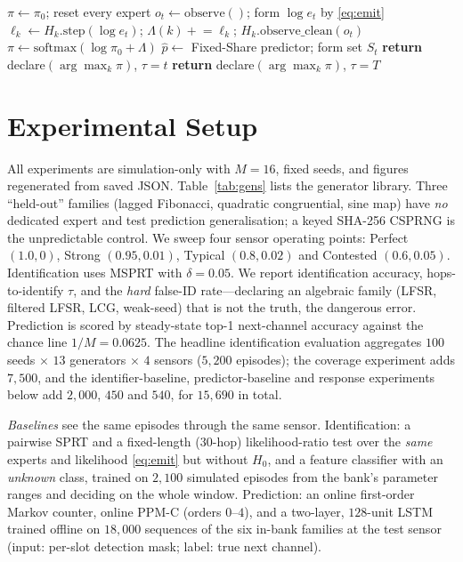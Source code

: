 \documentclass[conference]{IEEEtran}
\begin{document}
\begin{algorithm}[t]
\caption{Engagement loop (one emitter, window $T$)}
\label{alg:loop}
\begin{algorithmic}
\STATE $\pi\leftarrow\pi_0$; reset every expert
  \STATE $o_t\leftarrow\mathrm{observe}()$; form $\log e_t$ by \eqref{eq:emit}
     \STATE $\ell_k\leftarrow H_k.\mathrm{step}(\log e_t)$;\;
            $\Lambda(k)\mathrel{+}=\ell_k$;\; $H_k.\mathrm{observe\_clean}(o_t)$
  \ENDFOR
  \STATE $\pi\leftarrow\mathrm{softmax}(\log\pi_0+\Lambda)$
  \STATE $\hat p\leftarrow$ Fixed-Share predictor; form set $S_t$
     \STATE \textbf{return} declare$(\arg\max_k\pi)$, $\tau=t$
  \ENDIF
\ENDFOR
\STATE \textbf{return} declare$(\arg\max_k\pi)$, $\tau=T$
\end{algorithmic}
\end{algorithm}

\section{Experimental Setup}
\label{sec:setup}
All experiments are simulation-only with $M=16$, fixed seeds, and figures
regenerated from saved JSON. Table~\ref{tab:gens} lists the generator library.
Three ``held-out'' families (lagged Fibonacci, quadratic congruential, sine map)
have \emph{no} dedicated expert and test prediction generalisation; a keyed
SHA-256 CSPRNG is the unpredictable control. We sweep four sensor operating
points: Perfect $(1.0,0)$, Strong $(0.95,0.01)$, Typical $(0.8,0.02)$ and
Contested $(0.6,0.05)$. Identification uses MSPRT with $\delta=0.05$. We report
identification accuracy, hops-to-identify $\tau$, and the \emph{hard} false-ID
rate---declaring an algebraic family (LFSR, filtered LFSR, LCG, weak-seed) that
is not the truth, the dangerous error. Prediction is scored by steady-state
top-1 next-channel accuracy against the chance line $1/M=0.0625$. The headline
identification evaluation aggregates $100$ seeds $\times$ $13$ generators
$\times$ $4$ sensors ($5{,}200$ episodes); the coverage experiment adds
$7{,}500$, and the identifier-baseline, predictor-baseline and response
experiments below add $2{,}000$, $450$ and $540$, for $15{,}690$ in total.

\emph{Baselines} see the same episodes through the same sensor.
Identification: a pairwise SPRT and a fixed-length ($30$-hop) likelihood-ratio
test over the \emph{same} experts and likelihood \eqref{eq:emit} but without
$H_0$, and a feature classifier with an \emph{unknown} class, trained on
$2{,}100$ simulated episodes from the bank's parameter ranges and deciding on
the whole window. Prediction: an online first-order Markov counter, online
PPM-C (orders $0$--$4$), and a two-layer, $128$-unit LSTM trained offline on
$18{,}000$ sequences of the six in-bank families at the test sensor (input:
per-slot detection mask; label: true next channel).
\end{document}
